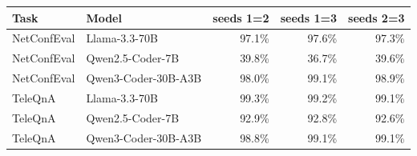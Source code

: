 \begin{tabular}{llrrr}
\toprule
Task & Model & seeds 1=2 & seeds 1=3 & seeds 2=3 \\
\midrule
NetConfEval & Llama-3.3-70B & 97.1\% & 97.6\% & 97.3\% \\
NetConfEval & Qwen2.5-Coder-7B & 39.8\% & 36.7\% & 39.6\% \\
NetConfEval & Qwen3-Coder-30B-A3B & 98.0\% & 99.1\% & 98.9\% \\
TeleQnA & Llama-3.3-70B & 99.3\% & 99.2\% & 99.1\% \\
TeleQnA & Qwen2.5-Coder-7B & 92.9\% & 92.8\% & 92.6\% \\
TeleQnA & Qwen3-Coder-30B-A3B & 98.8\% & 99.1\% & 99.1\% \\
\bottomrule
\end{tabular}
